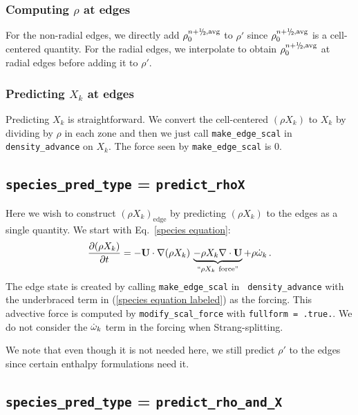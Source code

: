 \subsubsection{Computing $\rho$ at edges}\label{Computing rho at edges}
For the non-radial edges, we directly add $\rho_0^{n+\myhalf,{\rm avg}}$
to $\rho'$ since $\rho_0^{n+\myhalf,{\rm avg}}$ is a cell-centered
quantity.  For the radial edges, we interpolate to obtain
$\rho_0^{n+\myhalf,{\rm avg}}$ at radial edges before adding it to
$\rho'$.

\subsubsection{Predicting $X_k$ at edges}
\label{sec:pert:predict_X}
Predicting $X_k$ is straightforward.  We convert the cell-centered
$(\rho X_k)$ to $X_k$ by dividing by $\rho$ in each zone and then we
just call {\tt make\_edge\_scal} in {\tt density\_advance} on $X_k$.
The force seen by {\tt make\_edge\_scal} is 0.


\subsection{{\tt species\_pred\_type} = {\tt predict\_rhoX}}

Here we wish to construct $(\rho X_k)_\mathrm{edge}$ by predicting
$(\rho X_k)$ to the edges as a single quantity.  We start with
Eq.~\ref{species equation}:
\begin{equation}
\frac{\partial(\rho X_k)}{\partial t} =
  -{\bf U}\cdot\nabla(\rho X_k) \, \underbrace{-\rho X_k \nabla\cdot{\bf U}}_{``\rho X_k ~\text{force''}} + \rho \dot{\omega}_k \, . \label{species equation labeled}
\end{equation}
The edge state is created by calling {\tt make\_edge\_scal} in {\tt
  density\_advance} with the underbraced term in (\ref{species
  equation labeled}) as the forcing.  This advective force is computed
by {\tt modify\_scal\_force} with {\tt fullform = .true.}.  We do not
consider the $\dot{\omega}_k$ term in the forcing when Strang-splitting.


We note that even though it is not needed here, we still predict
$\rho'$ to the edges since certain enthalpy formulations need it.


\subsection{{\tt species\_pred\_type} = {\tt predict\_rho\_and\_X}}

